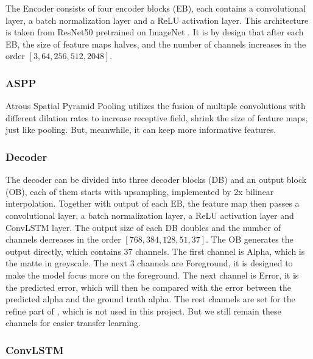 \documentclass[final]{cvpr}
\begin{document}
The Encoder consists of four encoder blocks (EB), each contains a convolutional layer, a batch normalization layer and a ReLU activation layer.
This architecture is taken from ResNet50 pretrained on ImageNet \cite{imagenet_cvpr09}.
It is by design that after each EB, the size of feature maps halves, and the number of channels increases in the order $[3, 64, 256, 512, 2048]$.

\subsubsection{ASPP}

Atrous Spatial Pyramid Pooling utilizes the fusion of multiple convolutions with different dilation rates to increase receptive field, shrink the size of feature maps, just like pooling.
But, meanwhile, it can keep more informative features.

\subsubsection{Decoder}

The decoder can be divided into three decoder blocks (DB) and an output block (OB), each of them starts with upsampling, implemented by 2x bilinear interpolation.
Together with output of each EB, the feature map then passes a convolutional layer, a batch normalization layer, a ReLU activation layer and ConvLSTM layer.
The output size of each DB doubles and the number of channels decreases in the order $[768, 384, 128, 51, 37]$.
The OB generates the output directly, which contains 37 channels.
The first channel is Alpha, which is the matte in greyscale.
The next 3 channels are Foreground, it is designed to make the model focus more on the foreground.
The next channel is Error, it is the predicted error, which will then be compared with the error between the predicted alpha and the ground truth alpha.
The rest channels are set for the refine part of \cite{linRealTimeHighResolutionBackground2020a}, which is not used in this project.
But we still remain these channels for easier transfer learning.

\subsubsection{ConvLSTM}
\end{document}
